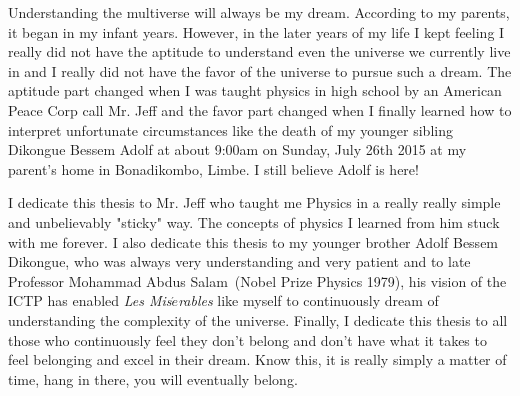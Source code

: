 Understanding the multiverse will always be my dream. According to my parents, it began in my infant years. However, in the later years of my life I kept feeling I really did not have the aptitude to understand even the universe we currently live in and I really did not have the favor of the universe  to pursue such a dream. The aptitude part changed when I was taught physics in high school by an American Peace Corp call Mr. Jeff and the favor part changed when I finally learned how to interpret unfortunate circumstances like the death of my younger sibling Dikongue Bessem Adolf at about 9:00am on Sunday, July 26th 2015 at my parent's home in Bonadikombo, Limbe. I still believe Adolf is here!
\par
I dedicate this thesis to Mr. Jeff who taught me Physics in a really really simple and unbelievably "sticky" way. The concepts of physics I learned from him stuck with me forever. 
I also dedicate this thesis to my younger brother Adolf Bessem Dikongue, who was always very understanding and very patient and to late Professor Mohammad Abdus Salam~(Nobel Prize Physics 1979), his vision of the ICTP has enabled \textit{Les Mis$\acute{e}$rables} like myself to continuously dream of understanding the complexity of the universe.
Finally, I dedicate this thesis to all those who continuously feel they don't belong and don't have what it takes to feel belonging and excel in their dream. Know this, it is really simply a matter of time, hang in there, you will eventually belong.
